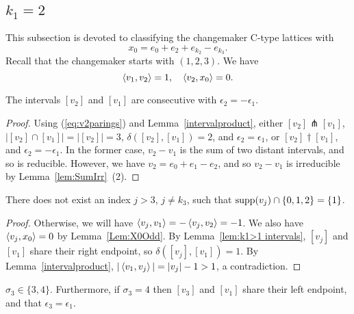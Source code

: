 \subsection{{\boldmath $k_1=2$}}\label{k1=2}

This subsection is devoted to classifying the changemaker C-type lattices with 
\begin{equation}\label{x0k1=2}
x_0=e_0+e_2+e_{k_2} - e_{k_3}.
\end{equation} 
Recall that the changemaker starts with $(1,2,3)$. We have
\begin{equation}\label{eq:v2parings}
\left\langle v_1 , v_2 \right\rangle=1,\quad \left\langle v_2 , x_0 \right\rangle=0.
\end{equation}

\begin{lemma}\label{lem:k1>1 intervals}
		The intervals $[v_2]$ and $[v_1]$ are consecutive with $\epsilon_2 = -\epsilon_1$. 
\end{lemma}

\begin{proof}
Using (\ref{eq:v2parings}) and Lemma~\ref{intervalproduct}, either $[v_2]\pitchfork [v_1]$, $|[v_2]\cap[v_1]|=|[v_2]|=3$, $\delta([v_2], [v_1])=2$, and $\epsilon_2=\epsilon_1$, or $[v_2]\dagger [v_1]$, and $\epsilon_2 = -\epsilon_1$. In the former case, $v_2-v_1$ is the sum of two distant intervals, and so is reducible. However, we have $v_2=e_0+e_1-e_2$, and so $v_2-v_1$ is irreducible by Lemma~\ref{lem:SumIrr}~(2).
\end{proof}

\begin{lemma}\label{lem:NoSingle1}
There does not exist an index $j>3$, $j\ne k_3$, such that $\operatorname{supp}(v_j)\cap\{0,1,2\}=\{1\}$.
\end{lemma}
\begin{proof}
Otherwise, we will have $\left\langle v_{j} , v_1 \right\rangle=-\left\langle v_{j} , v_2 \right\rangle=-1$. We also have $\left\langle v_{j} , x_0 \right\rangle=0$ by Lemma~\ref{Lem:X0Odd}. By Lemma~\ref{lem:k1>1 intervals}, $[v_{j}]$ and $[v_1]$ share their right endpoint, so $\delta([v_j],[v_1])=1$. By  Lemma~\ref{intervalproduct}, $|\left\langle v_1 , v_j \right\rangle|=|v_{j}|-1>1$, a contradiction. 
\end{proof}



\begin{lemma}\label{lem:k1=2 sigma3}
		$\sigma_3 \in \{3,4\}$. Furthermore, if $\sigma_3 = 4$ then $[v_3]$ and $[v_1]$ share their left endpoint, and that $\epsilon_3 = \epsilon_1$.  
\end{lemma}


